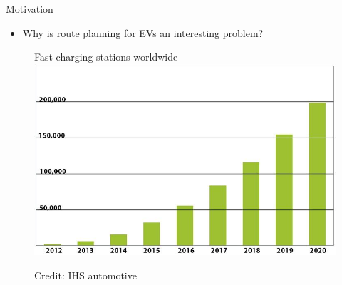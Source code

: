 \begin{frame}{Motivation}
\begin{itemize}
\item Why is route planning for EVs an interesting problem?
\end{itemize}
\begin{figure}[h!]
  \centering
  Fast-charging stations worldwide
    \includegraphics[height=0.5\textwidth]{images/forecast2}
  
      \tiny Credit: IHS automotive
\end{figure}
\end{frame}
